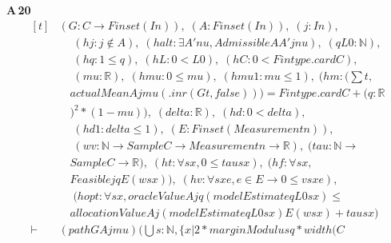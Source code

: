 \noindent\textbf{A\,20}\quad{}
{\footnotesize\[ \begin{aligned}[t]
&(\mathit{G} : \mathit{C} \to \mathit{Finset} (\mathit{I} \mathit{n})),\; (\mathit{A} : \mathit{Finset} (\mathit{I} \mathit{n})),\; (\mathit{j} : \mathit{I} \mathit{n}),\\
&\quad \; (\mathit{hj} : \mathit{j} \notin \mathit{A}),\; (\mathit{halt} : \exists \mathit{A'} \mathit{nu},\mathit{Admissible} \mathit{A} \mathit{A'} \mathit{j} \mathit{nu}),\; (\mathit{q} \mathit{L0} : \mathbb{N} ),\\
&\quad \; (\mathit{hq} : 1 \leq \mathit{q}),\; (\mathit{hL} : 0 < \mathit{L0}),\; (\mathit{hC} : 0 < \mathit{Fintype}.\mathit{card} \mathit{C}),\\
&\quad \; (\mathit{mu} : \mathbb{R} ),\; (\mathit{hmu} : 0 \leq \mathit{mu}),\; (\mathit{hmu1} : \mathit{mu} \leq 1),\; (\mathit{hm} : (\textstyle\sum \mathit{t},\\
&\quad \mathit{actualMean} \mathit{A} \mathit{j} \mathit{mu} (.\mathit{inr} (\mathit{G} \mathit{t},\mathit{false}))) = \mathit{Fintype}.\mathit{card} \mathit{C}+(\mathit{q}:\mathbb{R}\\
&\quad )^{2}*(1-\mathit{mu})),\; (\mathit{delta} : \mathbb{R} ),\; (\mathit{hd} : 0 < \mathit{delta}),\\
&\quad \; (\mathit{hd1} : \mathit{delta} \leq 1),\; (\mathit{E} : \mathit{Finset} (\mathit{Measurement} \mathit{n})),\\
&\quad \; (\mathit{w} \mathit{v} : \mathbb{N} \to \mathit{Sample} \mathit{C} \to \mathit{Measurement} \mathit{n} \to \mathbb{R} ),\; (\mathit{tau} : \mathbb{N} \to\\
&\quad \mathit{Sample} \mathit{C} \to \mathbb{R} ),\; (\mathit{ht} : \forall \mathit{s} \mathit{x},0 \leq \mathit{tau} \mathit{s} \mathit{x}),\; (\mathit{hf} : \forall \mathit{s} \mathit{x},\\
&\quad \mathit{Feasible} \mathit{j} \mathit{q} \mathit{E} (\mathit{w} \mathit{s} \mathit{x})),\; (\mathit{hv} : \forall \mathit{s} \mathit{x} \mathit{e},\mathit{e} \in \mathit{E} \to 0 \leq \mathit{v} \mathit{s} \mathit{x} \mathit{e}),\\
&\quad \; (\mathit{hopt} : \forall \mathit{s} \mathit{x},\mathit{oracleValue} \mathit{A} \mathit{j} \mathit{q} (\mathit{modelEstimate} \mathit{q} \mathit{L0} \mathit{s} \mathit{x}) \leq\\
&\quad \mathit{allocationValue} \mathit{A} \mathit{j} (\mathit{modelEstimate} \mathit{q} \mathit{L0} \mathit{s} \mathit{x}) \mathit{E} (\mathit{w} \mathit{s} \mathit{x})+\mathit{tau} \mathit{s} \mathit{x})\\
\vdash\;&(\mathit{path} \mathit{G} \mathit{A} \mathit{j} \mathit{mu}) (⋃ \mathit{s} : \mathbb{N} ,\{ \mathit{x} | 2*\mathit{marginModulus} \mathit{q}*\mathit{width} (\mathit{C}
\end{aligned} \]}

